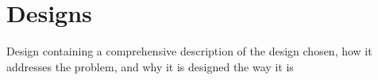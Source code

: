 \section{Designs}
{\color{red} Design containing a comprehensive description of the design chosen, how it addresses the problem, and why it is designed the way it is}